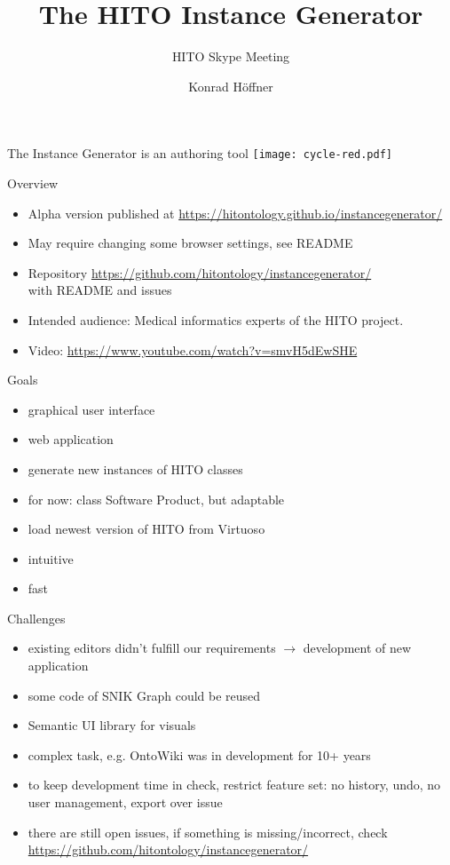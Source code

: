 \documentclass[aspectratio=1610]{beamer}
\title{The HITO Instance Generator}
\subtitle{HITO Skype Meeting}
\author{Konrad Höffner}
\begin{document}
\begin{frame}
\titlepage
\end{frame}

\begin{frame}{The Instance Generator is an authoring tool}
\centering
\texttt{[image: cycle-red.pdf]}
\end{frame}

\begin{frame}{Overview}
\begin{itemize}
\item Alpha version published at \url{https://hitontology.github.io/instancegenerator/}
\item May require changing some browser settings, see README
\item Repository \url{https://github.com/hitontology/instancegenerator/}\\with README and issues
\item Intended audience: Medical informatics experts of the HITO project.
\item Video: \url{https://www.youtube.com/watch?v=smvH5dEwSHE}
\end{itemize}
\end{frame}

\begin{frame}{Goals}
\centering
\begin{itemize}
\item graphical user interface
\item web application
\item generate new instances of HITO classes
\item for now: class Software Product, but adaptable
\item load newest version of HITO from Virtuoso 
\item intuitive 
\item fast
\end{itemize}
\end{frame}

\begin{frame}{Challenges}
\begin{itemize}
\item existing editors didn't fulfill our requirements $\rightarrow$ development of new application
\item some code of SNIK Graph could be reused
\item Semantic UI library for visuals
\item complex task, e.g. OntoWiki was in development for 10+ years
\item to keep development time in check, restrict feature set: no history, undo, no user management, export over issue
\item there are still open issues, if something is missing/incorrect, check \url{https://github.com/hitontology/instancegenerator/}
\end{itemize}
\end{frame}
\end{document}
